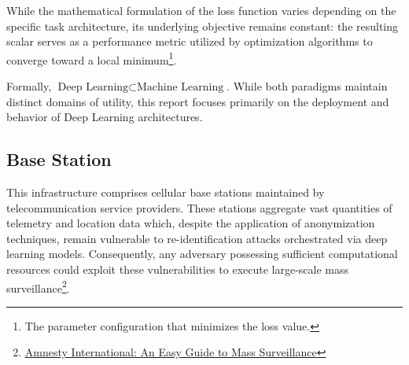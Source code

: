 While the mathematical formulation of the loss function varies depending on the specific task architecture, its underlying objective remains constant: the resulting scalar serves as a performance metric utilized by optimization algorithms to converge toward a local minimum\footnote{The parameter configuration that minimizes the loss value.}.

Formally, $\text{Deep Learning} \subset \text{Machine Learning}$. While both paradigms maintain distinct domains of utility, this report focuses primarily on the deployment and behavior of Deep Learning architectures.

\subsection{Base Station}
This infrastructure comprises cellular base stations maintained by telecommunication service providers. These stations aggregate vast quantities of telemetry and location data which, despite the application of anonymization techniques, remain vulnerable to re-identification attacks orchestrated via deep learning models. Consequently, any adversary possessing sufficient computational resources could exploit these vulnerabilities to execute large-scale mass surveillance\footnote{\href{https://www.amnesty.org/en/latest/campaigns/2015/03/easy-guide-to-mass-surveillance/}{Amnesty International: An Easy Guide to Mass Surveillance}}.

